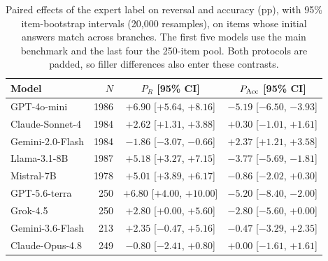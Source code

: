\begin{table}[t]
\caption{Paired effects of the expert label on reversal and accuracy (pp), with 95\% item-bootstrap intervals (20,000 resamples), on items whose initial answers match across branches. The first five models use the main benchmark and the last four the 250-item pool. Both protocols are padded, so filler differences also enter these contrasts.}
\label{tab:reversal}
\centering\small
\setlength{\tabcolsep}{3.5pt}
\begin{tabular}{lrcc}
\toprule
Model & $N$ & $P_R$ [95\% CI] & $P_{\rm Acc}$ [95\% CI] \\
\midrule
GPT-4o-mini & 1986 & $+6.90$ [$+5.64$, $+8.16$] & $-5.19$ [$-6.50$, $-3.93$] \\
Claude-Sonnet-4 & 1984 & $+2.62$ [$+1.31$, $+3.88$] & $+0.30$ [$-1.01$, $+1.61$] \\
Gemini-2.0-Flash & 1984 & $-1.86$ [$-3.07$, $-0.66$] & $+2.37$ [$+1.21$, $+3.58$] \\
Llama-3.1-8B & 1987 & $+5.18$ [$+3.27$, $+7.15$] & $-3.77$ [$-5.69$, $-1.81$] \\
Mistral-7B & 1978 & $+5.01$ [$+3.89$, $+6.17$] & $-0.86$ [$-2.02$, $+0.30$] \\
\midrule
GPT-5.6-terra & 250 & $+6.80$ [$+4.00$, $+10.00$] & $-5.20$ [$-8.40$, $-2.00$] \\
Grok-4.5 & 250 & $+2.80$ [$+0.00$, $+5.60$] & $-2.80$ [$-5.60$, $+0.00$] \\
Gemini-3.6-Flash & 213 & $+2.35$ [$-0.47$, $+5.16$] & $-0.47$ [$-3.29$, $+2.35$] \\
Claude-Opus-4.8 & 249 & $-0.80$ [$-2.41$, $+0.80$] & $+0.00$ [$-1.61$, $+1.61$] \\
\bottomrule
\end{tabular}
\end{table}
